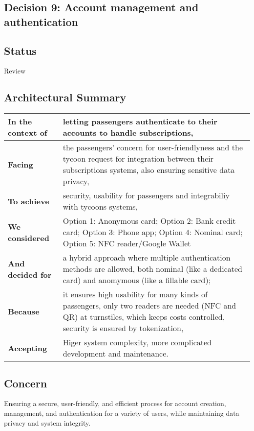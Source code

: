 \subsection{Decision 9: Account management and authentication}

\subsection*{Status}
Review

\subsection*{Architectural Summary}
\begin{tabular}{|p{3.5cm}|p{10.5cm}|}
    \hline
    \textbf{In the context of} & letting passengers authenticate to their accounts to handle subscriptions, \\
    \hline
    \textbf{Facing} & the passengers' concern for user-friendlyness and the tycoon request for integration between their subscriptions systems, also ensuring sensitive data privacy, \\
    \hline
    \textbf{To achieve} & security, usability for passengers and integrabiliy with tycoons systems, \\
    \hline
    \textbf{We considered} & Option 1: Anonymous card; Option 2: Bank credit card; Option 3: Phone app; Option 4: Nominal card; Option 5: NFC reader/Google Wallet\\
    \hline
    \textbf{And decided for} & a hybrid approach where multiple authentication methods are allowed, both nominal (like a dedicated card) and anomymous (like a fillable card);\\
    \hline
    \textbf{Because} & it ensures high usability for many kinds of passengers, only two readers are needed (NFC and QR) at turnstiles, which keeps costs controlled, security is ensured by tokenization, \\
    \hline
    \textbf{Accepting} & Higer system complexity, more complicated development and maintenance. \\
    \hline
\end{tabular}

\subsection*{Concern}
Ensuring a secure, user-friendly, and efficient process for account creation, management, and authentication for a variety of users, while maintaining data privacy and system integrity.

